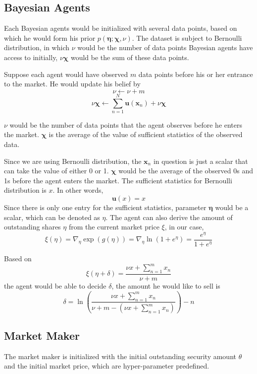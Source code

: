 \documentclass[12pt]{article}
\begin{document}
\subsection{Bayesian Agents}\label{Bayesian-agents}
Each Bayesian agents would be initialized with several data points, based on which he would form his prior $p(\boldsymbol{\eta}; \boldsymbol{\chi}, \nu)$. The dataset is subject to Bernoulli distribution, %
 in which $\nu$ would be the number of data points Bayesian agents have access to initially, $\nu\boldsymbol{\chi}$ would be the sum of these data points.

Suppose each agent would have observed $m$ data points before his or her entrance to the market. He would update his belief by %
$$\nu\leftarrow\nu+m$$ $$\nu\bm{\chi} \leftarrow \sum_{n=1}^{N} \mathbf{u}\left(\mathbf{x}_{n}\right)+\nu \bm{\chi}$$

$\nu$ would be the number of data points that the agent observes before he enters the market. $\boldsymbol{\chi}$ is the average of the value of sufficient statistics of the observed data.

Since we are using Bernoulli distribution, the $\mathbf{x}_n$ in question is just a scalar that can take the value of either 0 or 1. $\boldsymbol{\chi}$ would be the average of the observed 0s and 1s before the agent enters the market. The sufficient statistics for Bernoulli distribution is $x$. In other words,
\begin{displaymath}
\mathbf{u}(x) = x
\end{displaymath}
Since there is only one entry for the sufficient statistics, parameter $\boldsymbol{\eta}$ would be a scalar, which can be denoted as $\eta$. 
The agent can also derive the amount of outstanding shares $\eta$ from the current market price $\xi$, in our case, 
\begin{equation}
    \xi(\eta) = \nabla_{\eta}\exp{(g(\eta))}=\nabla_{\eta}\ln \left(1+e^{\eta}\right)=\frac{e^{\eta}}{1+e^{\eta}}
\end{equation}

Based on %
$$\xi(\eta+\delta)=\frac{\nu x+\sum_{n=1}^{m}x_n}{\nu+m}$$ the agent would be able to decide $\delta$, the amount he would like to sell is
$$
    \delta=\ln{(\frac{\nu x+\sum_{n=1}^{m}x_n}{\nu+m-(\nu x+\sum_{n=1}^{m}x_n)})}-n
$$

\subsection{Market Maker}\label{market-maker}
The market maker is initialized with the initial outstanding security amount $\theta$ and the initial market price, which are hyper-parameter predefined.
\end{document}
